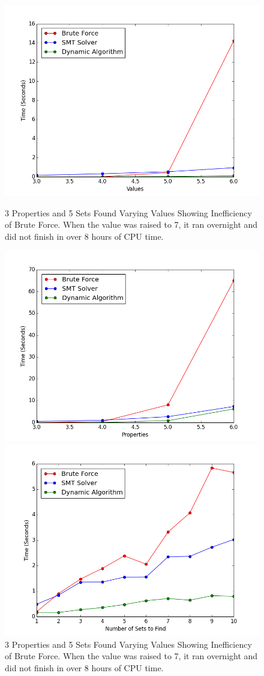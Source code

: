 \documentclass[pageno]{jpaper}
\begin{document}
\begin{figure}[htbb]
\begin{minipage}[b]{0.5\linewidth}
\centering
\includegraphics[width=.75\linewidth]{BADBRUTEVAL-v3456p3n5.png}
\caption{3 Properties and 5 Sets Found Varying Values Showing Inefficiency of Brute Force. When the value was raised to 7, it ran overnight and did not finish in over 8 hours of CPU time.}
\label{fig:bruteVal}
\end{minipage}
\hspace{0.5cm}
\begin{minipage}[b]{0.5\linewidth}
\centering
\includegraphics[width=.75\linewidth]{BADBRUTEPROP-v4p3456n10.png}
\caption{3 Properties and 5 Sets Found Varying Values Showing Inefficiency of Brute Force. When the value was raised to 7, it ran overnight and did not finish in over 8 hours of CPU time.}
\label{fig:bruteProp}
\end{minipage}
\hspace{0.5cm}
\begin{minipage}[b]{0.5\linewidth}
\centering
\includegraphics[width=.75\linewidth]{BADBRUTESETS-v4p5n12345678910.png}

\end{minipage}
\end{figure}
\end{document}
